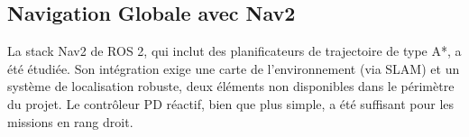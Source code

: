 
\subsection{Navigation Globale avec Nav2}
La stack Nav2 de ROS 2, qui inclut des planificateurs de trajectoire de type A*, a été étudiée. Son intégration exige une carte de l'environnement (via SLAM) et un système de localisation robuste, deux éléments non disponibles dans le périmètre du projet. Le contrôleur PD réactif, bien que plus simple, a été suffisant pour les missions en rang droit.
